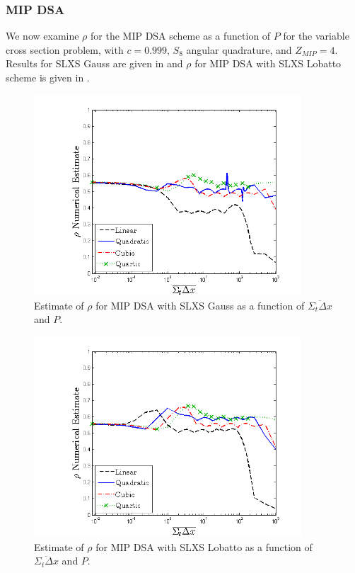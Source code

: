 \subsubsection{MIP DSA}

We now examine $\rho$ for the MIP DSA scheme as a function of $P$ for the variable cross section problem, with $c=0.999$, $S_8$ angular quadrature, and $Z_{MIP}=4$.  
Results for SLXS Gauss are given in  and $\rho$ for MIP DSA with SLXS Lobatto scheme is given in .
\begin{figure}[!htp]
\centering
\includegraphics[width=10cm]{chapter4_acceleration/Const_4_Variable_XS_MIP_Gauss.png}
\caption{Estimate of $\rho$ for MIP DSA with SLXS Gauss as a function of $\overline{\Sigma_t \Delta x}$ and $P$.}
\label{fig:varxs_mip_gauss}
\end{figure}
\begin{figure}[!htp]
\centering
\includegraphics[width=10cm]{chapter4_acceleration/Const_4_Variable_XS_MIP_Lobatto.png}
\caption{Estimate of $\rho$ for MIP DSA with SLXS Lobatto as a function of $\overline{\Sigma_t \Delta x}$ and $P$.}
\label{fig:varxs_mip_lobatto}
\end{figure}
